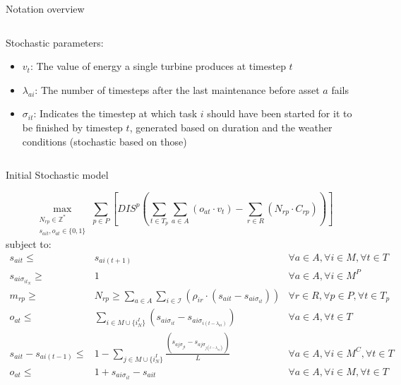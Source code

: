 \documentclass{beamer}
\begin{document}
\begin{frame}{Notation overview}
\begin{columns}
\begin{column}{.48\textwidth}
Stochastic parameters:
\begin{itemize}
\item $v_t$: The value of energy a single turbine produces at timestep $t$
\item $\lambda_{ai}$: The number of timesteps after the last maintenance before asset $a$ fails
\item $\sigma_{it}$: Indicates the timestep at which task $i$ should have been started for it to be finished by timestep $t$, generated based on duration and the weather conditions (stochastic based on those)
\end{itemize}
\end{column}
\end{columns}
\end{frame}


\begin{frame}{Initial Stochastic model}
\scriptsize

\begin{equation}
	\max_{\substack{N_{rp} \in \mathbb{Z}^* \\ 
	s_{ait}, o_{at} \in \{0, 1\}}} 
	\sum_{p \in P} [ DIS^p (\sum_{t\in T_p} \sum_{a \in A} (o_{at} \cdot v_t)  - \sum_{r\in R} (N_{rp} \cdot C_{rp})) ]
\end{equation}
subject to:
\begin{align}
s_{ait} \leq& s_{ai(t+1)}															& \forall a \in A, \forall i \in M, \forall t \in T		\\
s_{ai\sigma_{it_N}} \geq& 1														& \forall a \in A, \forall i \in M^P			\\
m_{rp} \geq& N_{rp} \geq \sum_{a\in A} \sum_{i\in \mathcal{I}} (\rho_{ir} \cdot (s_{ait} - s_{ai\sigma_{it}})) 		& \forall r \in R, \forall p \in P, \forall t \in T_p 			\\
o_{at} \leq& \sum_{i \in M \cup \{i^I_N\}} (s_{ai\sigma_{it}} - s_{ai\sigma_{i(t-\lambda_{ai})}})				& \forall a \in A, \forall t \in T					\\
s_{ait} - s_{ai(t-1)} \leq& 1 - \sum_{j \in M \cup \{i^I_N\}} \frac{(s_{aj\sigma_{jt}} - s_{aj\sigma_{j(t-\lambda_{aj})}})}{L}		& \forall a \in A, \forall i \in M^C, \forall t \in T 	\\
o_{at} \leq& 1 + s_{ai\sigma_{it}} - s_{ait}												& \forall a \in A, \forall i \in M, \forall t \in T		
\end{align}

\end{frame}
\end{document}
